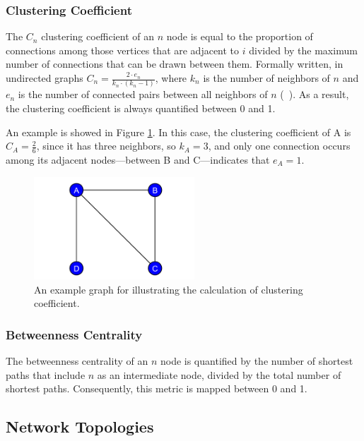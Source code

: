 \subsubsection{Clustering Coefficient}

The $C_n$ clustering coefficient of an $n$ node is equal to the proportion of connections among those vertices that are adjacent to $i$ divided by the maximum number of connections that can be drawn between them. Formally written, in undirected graphs $C_n = \frac{2\cdot e_n}{k_n\cdot(k_n-1) }$, where $k_n$ is the number of neighbors of $n$ and $e_n$ is the number of connected pairs between all neighbors of $n$ (~\cite{clustering_formula}). As a result, the clustering coefficient is always quantified between 0 and 1.

An example is showed in Figure \ref{fig:clustering}. In this case, the clustering coefficient of \textsf{A} is $C_A = \frac{2}{6}$, since it has three neighbors, so $k_A = 3$, and only one connection occurs among its adjacent nodes---between \textsf{B} and \textsf{C}---indicates that $e_A = 1$.
\begin{figure}[!ht]
	\centering
	\includegraphics[width=60mm, keepaspectratio]{figures/clustering.pdf}
	\caption{An example graph for illustrating the calculation of clustering coefficient.}
	\label{fig:clustering}
\end{figure}

\subsubsection{Betweenness Centrality}

The betweenness centrality of an $n$ node is quantified by the number of shortest paths that include $n$ as an intermediate node, divided by the total number of shortest paths. Consequently, this metric is mapped between 0 and 1.

\subsection{Network Topologies} \label{sec:topologies}

